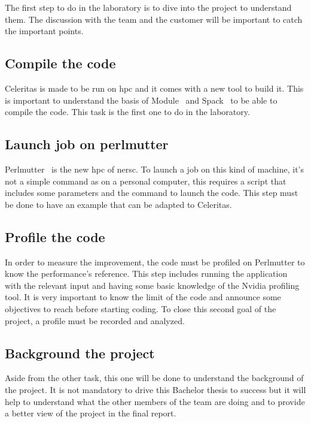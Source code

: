 The first step to do in the laboratory is to dive into the project to understand them.
The discussion with the team and the customer will be important to catch the important points.


\subsection{Compile the code}
\label{spec:ch:activities:understand-the-project:compile-the-code}

Celeritas is made to be run on \acrshort{hpc} and it comes with a new tool to build it.
This is important to understand the basis of Module~\cite{Module} and Spack~\cite{Spack} to be able to compile the code.
This task is the first one to do in the laboratory.


\subsection{Launch job on perlmutter}
\label{spec:ch:activities:understand-the-project:launch-job-on-perlmutter}
Perlmutter~\cite{Perlmutter} is the new \acrshort{hpc} of \acrshort{nersc}.
To launch a job on this kind of machine, it's not a simple command as on a personal computer, this requires a script that includes some parameters and the command to launch the code.
This step must be done to have an example that can be adapted to Celeritas.


\subsection{Profile the code}
\label{specspec:ch:activities:understand-the-project:profile-the-code}

In order to measure the improvement, the code must be profiled on Perlmutter to know the performance's reference.
This step includes running the application with the relevant input and having some basic knowledge of the Nvidia profiling tool.
It is very important to know the limit of the code and announce some objectives to reach before starting coding.
To close this second goal of the project, a profile must be recorded and analyzed.


\subsection{Background the project}
\label{spec:ch:activities:understand-the-project:background-the-project}

Aside from the other task, this one will be done to understand the background of the project.
It is not mandatory to drive this Bachelor thesis to success but it will help to understand what the other members of the team are doing and to provide a better view of the project in the final report.



